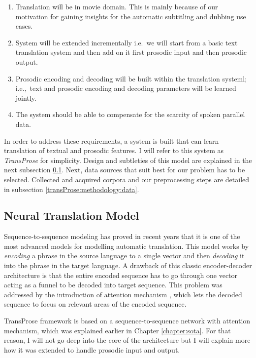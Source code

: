 \begin{enumerate}
    \item Translation will be in movie domain. This is mainly because of our motivation for gaining insights for the automatic subtitling and dubbing use cases. 
    \item System will be extended incrementally i.e.~we will start from a basic text translation system and then add on it first prosodic input and then prosodic output. 
    \item Prosodic encoding and decoding will be built within the translation systeml; i.e.,~text and prosodic encoding and decoding parameters will be learned jointly. 
    \item The system should be able to compensate for the scarcity of spoken parallel data. 
\end{enumerate}

In order to address these requirements, a system is built that can learn translation of textual and prosodic features. I will refer to this system as \textit{TransProse} for simplicity. Design and subtleties of this model are explained in the next subsection \ref{transProse:methodology:model}. Next, data sources that suit best for our problem has to be selected. Collected and acquired corpora and our preprocessing steps are detailed in subsection \ref{transProse:methodology:data}. 

\subsection{Neural Translation Model}
\label{transProse:methodology:model}

Sequence-to-sequence modeling has proved in recent years that it is one of the most advanced models for modelling automatic translation. This model works by \textit{encoding} a phrase in the source language to a single vector and then \textit{decoding} it into the phrase in the target language. A drawback of this classic encoder-decoder architecture is that the entire encoded sequence has to go through one vector acting as a funnel to be decoded into target sequence. This problem was addressed by the introduction of attention mechanism \citep{bahdanau, luong}, which lets the decoded sequence to focus on relevant areas of the encoded sequence.

TransProse framework is based on a sequence-to-sequence network with attention mechanism, which was explained earlier in Chapter \ref{chapter:sota}. For that reason, I will not go deep into the core of the architecture but I will explain more how it was extended to handle prosodic input and output. 
